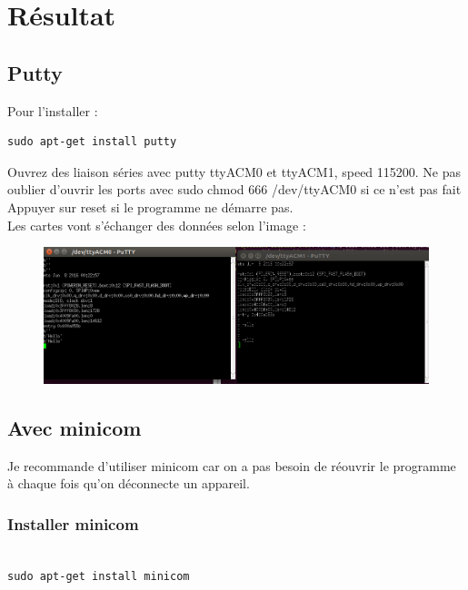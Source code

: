 \documentclass{article}
\begin{document}
\section{Résultat}

\subsection{Putty}
Pour l'installer :

\begin{verbatim}
sudo apt-get install putty
\end{verbatim}

Ouvrez des liaison séries avec putty ttyACM0 et ttyACM1, speed 115200.
Ne pas oublier d'ouvrir les ports avec sudo chmod 666 /dev/ttyACM0 si ce n'est pas fait \\
Appuyer sur reset si le programme ne démarre pas.\\

Les cartes vont s'échanger des données selon l'image :

\begin{figure}[H]
\begin{center}
\advance\leftskip-3cm
\advance\rightskip-3cm
\includegraphics[keepaspectratio=true,scale=0.5]{loramc_lopy.png}
\label{visina8}
\end{center}\end{figure}

\subsection{Avec minicom}
Je recommande d'utiliser minicom car on a pas besoin de réouvrir le programme à chaque fois qu'on déconnecte un appareil.

\subsubsection{Installer minicom}
\begin{verbatim}

sudo apt-get install minicom

\end{verbatim}
\end{document}
